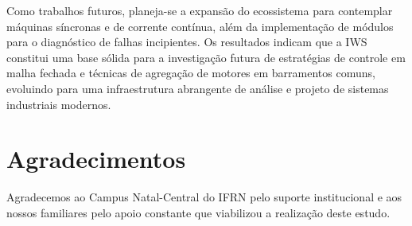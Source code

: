 \documentclass[a4paper]{ifacconf}
\begin{document}
Como trabalhos futuros, planeja-se a expansão do ecossistema para contemplar máquinas síncronas e de corrente contínua, além da implementação de módulos para o diagnóstico de falhas incipientes. Os resultados indicam que a IWS constitui uma base sólida para a investigação futura de estratégias de controle em malha fechada e técnicas de agregação de motores em barramentos comuns, evoluindo para uma infraestrutura abrangente de análise e projeto de sistemas industriais modernos.

\section*{Agradecimentos}

Agradecemos ao Campus Natal-Central do IFRN pelo suporte institucional e aos nossos familiares pelo apoio constante que viabilizou a realização deste estudo.


\end{document}
